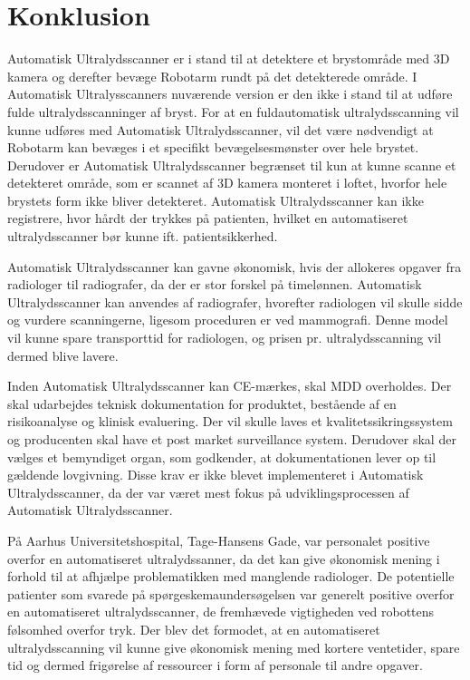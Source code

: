\chapter{Konklusion}\label{kapitel_Konklusion}
Automatisk Ultralydsscanner er i stand til at detektere et brystområde med 3D kamera og derefter bevæge Robotarm rundt på det detekterede område. I Automatisk Ultralysscanners nuværende version er den ikke i stand til at udføre fulde ultralydsscanninger af bryst. For at en fuldautomatisk ultralydsscanning vil kunne udføres med Automatisk Ultralydsscanner, vil det være nødvendigt at Robotarm kan bevæges i et specifikt bevægelsesmønster over hele brystet. Derudover er Automatisk Ultralydsscanner begrænset til kun at kunne scanne et detekteret område, som er scannet af 3D kamera monteret i loftet, hvorfor hele brystets form ikke bliver detekteret. Automatisk Ultralydsscanner kan ikke registrere, hvor hårdt der trykkes på patienten, hvilket en automatiseret ultralydsscanner bør kunne ift. patientsikkerhed. 

Automatisk Ultralydsscanner kan gavne økonomisk, hvis der allokeres opgaver fra radiologer til radiografer, da der er stor forskel på timelønnen. Automatisk Ultralydsscanner kan anvendes af radiografer, hvorefter radiologen vil skulle sidde og vurdere scanningerne, ligesom proceduren er ved mammografi. Denne model vil kunne spare transporttid for radiologen, og prisen pr. ultralydsscanning vil dermed blive lavere.  

Inden Automatisk Ultralydsscanner kan CE-mærkes, skal MDD overholdes. Der skal udarbejdes teknisk dokumentation for produktet, bestående af en risikoanalyse og klinisk evaluering. Der vil skulle laves et kvalitetssikringssystem og producenten skal have et post market surveillance system. Derudover skal der vælges et bemyndiget organ, som godkender, at dokumentationen lever op til gældende lovgivning. Disse krav er ikke blevet implementeret i Automatisk Ultralydsscanner, da der var været mest fokus på udviklingsprocessen af Automatisk Ultralydsscanner. 

På Aarhus Universitetshospital, Tage-Hansens Gade, var personalet positive overfor en automatiseret ultralydssanner, da det kan give økonomisk mening i forhold til at afhjælpe problematikken med manglende radiologer. De potentielle patienter som svarede på spørgeskemaundersøgelsen var generelt positive overfor en automatiseret ultralydsscanner, de fremhævede vigtigheden ved robottens følsomhed overfor tryk. Der blev det formodet, at en automatiseret ultralydsscanning vil kunne give økonomisk mening med kortere ventetider, spare tid og dermed frigørelse af ressourcer i form af personale til andre opgaver. 
